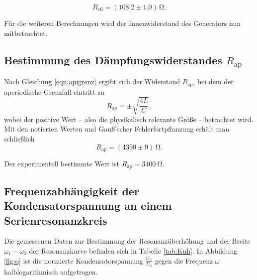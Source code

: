 \begin{equation*}
	R_{\text{eff}}= (108.2 \pm 1.0) \,\si{\ohm} \text{.}
\end{equation*}

Für die weiteren Berechnungen wird der Innenwiderstand des Generators nun mitbetrachtet.

\subsection{Bestimmung des Dämpfungswiderstandes $R_{\text{ap}}$}

Nach Gleichung \eqref{eqn:apigrenz} ergibt sich der Widerstand $R_{\text{ap}}$, bei dem der
aperiodische Grenzfall eintritt zu
\begin{equation}
	R_{\text{ap}} = \pm \sqrt{\frac{4L}{C}} \, \text{,}
	\label{eqn:rap}
\end{equation}
wobei der positive Wert -- also die physikalisch relevante Größe -- betrachtet wird.
Mit den notierten Werten und Gauß'scher Fehlerfortpflanzung erhält man schließlich
\begin{equation*}
	R_{\text{ap}} = (4390 \pm 9) \, \si{\ohm} \text{.}
\end{equation*}

Der experimentell bestimmte Wert ist $R_{\text{ap}} = \SI{3400}{\ohm}$.
\subsection{Frequenzabhängigkeit der Kondensatorspannung an einem Serienresonanzkreis}
Die gemessenen Daten zur Bestimmung der Resonanzüberhöhung und der Breite $ \omega_1 - \omega_2 $ der Resonanzkurve befinden sich in Tabelle \ref{tab:Kuh}.
In Abbildung \ref{fig:q} ist die normierte Kondensatorspannung $\frac{U_{\mathrm{C}}}{U_{\mathrm{0}}}$ gegen die Frequenz $\omega$ halblogarithmisch aufgetragen.

